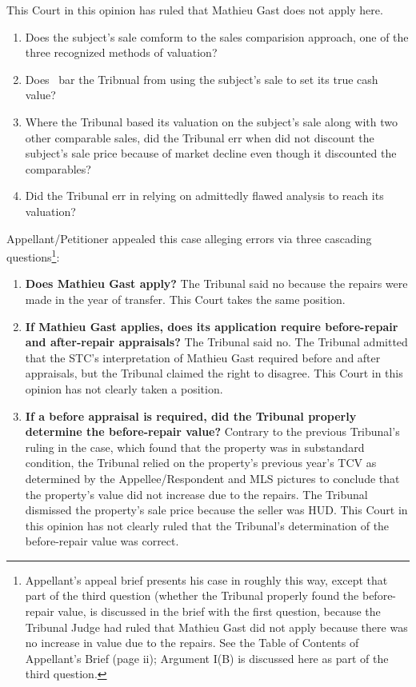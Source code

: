 \documentclass[12pt,\documentclassflag]{michiganCourtOfAppealsBrief}
\begin{document}
This Court in this opinion has ruled that Mathieu Gast does not apply here.
\begin{enumerate}
\item Does the subject's sale comform to the sales comparision approach, one of the three recognized methods of valuation?
  
\item Does \cite[s]{MCL 211.27(6)}\ bar the Tribnual from using the subject's sale to set its true cash value?
  
\item Where the Tribunal based its valuation on the subject's sale along with two other comparable sales, did the Tribunal err when did not discount the subject's sale price because of market decline even though it discounted the comparables?

\item Did the Tribunal err in relying on admittedly flawed analysis to reach its valuation?
\end{enumerate}  


Appellant/Petitioner appealed this case alleging errors via three cascading questions\footnote{Appellant's appeal brief presents his case in roughly this way, except that part of the third question (whether the Tribunal properly found the before-repair value, is discussed in the brief with the first question, because the Tribunal Judge had ruled that Mathieu Gast did not apply because there was no increase in value due to the repairs. See the Table of Contents of Appellant's Brief (page ii); Argument I(B) is discussed here as part of the third question.}:

\begin{enumerate}
\item \textbf{Does Mathieu Gast apply?}
  The Tribunal said no because the repairs were made in the year of transfer.
  This Court takes the same position.
\item \textbf{If Mathieu Gast applies, does its application require before-repair and after-repair appraisals?}
The Tribunal said no. The Tribunal admitted that the STC's interpretation of Mathieu Gast required before and after appraisals, but the Tribunal claimed the right to disagree. This Court in this opinion has not clearly taken a position. 
\item \textbf{If a before appraisal is required, did the Tribunal properly determine the before-repair value?}
  Contrary to the previous Tribunal's ruling in the case, which found that the property was in substandard condition, the Tribunal relied on the property's previous year's TCV as determined by the Appellee/Respondent and MLS pictures to conclude that the property's value did not increase due to the repairs. The Tribunal dismissed the property's sale price because the seller was HUD. This Court in this opinion has not clearly ruled that the Tribunal's determination of the before-repair value was correct. 
\end{enumerate}
\end{document}
